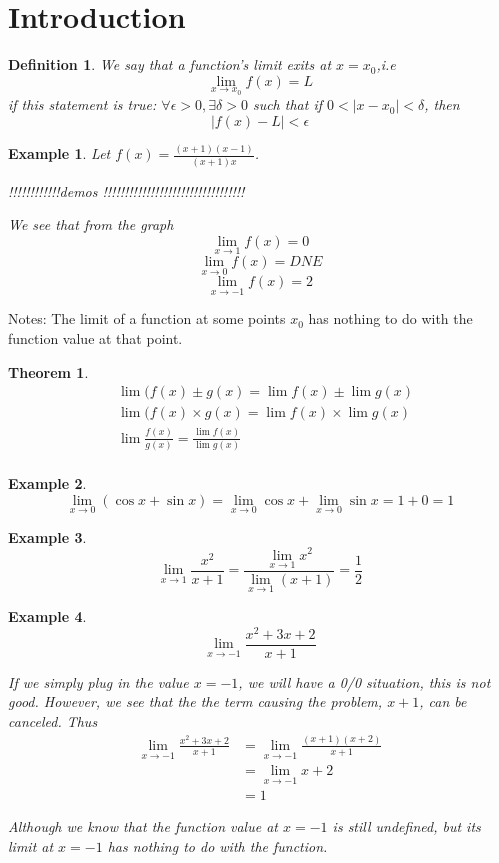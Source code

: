 \documentclass{article}
\newtheorem{definition}{Definition}
\newtheorem{ex}{Example}
\newtheorem{thm}{Theorem}
\begin{document}
\section{Introduction}
\begin{definition}
	 We say that a function's limit exits at $x= x_0$,i.e 
	 \[ \lim_{x\to x_0} f(x) = L \]
	 if this statement is true: $\forall \epsilon>0, \exists \delta>0$ such that if $0<|x-x_0|<\delta$, then
	\[ |f(x)-L| < \epsilon \]
\end{definition}

\begin{ex}
	Let $f(x) = \frac{(x+1)(x-1)}{(x+1)x} $.
	\begin{center}
	 !!!!!!!!!!!!demos !!!!!!!!!!!!!!!!!!!!!!!!!!!!!!!!!
	\end{center}
We see that from the graph 
\[ \lim_{x\to1} f(x) = 0 \]
\[ \lim_{x\to0} f(x) = DNE\]
\[ \lim_{x\to-1} f(x) = 2 \]

\end{ex}

Notes: The limit of a function at some points $x_0$ has nothing to do with the function value at that point.

\begin{thm}
	\begin{align*}
	&\lim (f(x) \pm g(x) = \lim f(x) \pm \lim g(x)\\
	&\lim (f(x) \times g(x) = \lim f(x) \times \lim g(x)\\
	&\lim \frac{f(x)}{g(x)} =\frac{ \lim f(x)}{\lim g(x)}\\
	\end{align*}
\end{thm}

\begin{ex}
	\[\lim_{x\to 0}(\cos x+ \sin x) = \lim_{x\to 0}\cos x + \lim_{x\to 0}\sin x = 1+ 0 =1 \]
\end{ex}

\begin{ex}
	\[ \lim_{x\to 1} \frac{x^2}{x+1} = \frac{\lim_{x\to1} x^2}{\lim_{x\to 1}(x+1)} = \frac{1}{2} \]
\end{ex}
 
\begin{ex}
	\[\lim_{x\to-1}\frac{x^2 + 3x + 2}{x+1}\]
	
	If we simply plug in the value $x=-1$, we will have a 0/0 situation, this is not good. However, we see that the the term causing the problem, $x+1$, can be canceled. Thus
	\begin{align*}
		\lim_{x\to-1} \frac{x^2 +3x +2 }{x+1} 
		&= \lim_{x\to-1} \frac{(x+1)(x+2)}{x+1}\\
		&= \lim_{x\to-1} x+2\\
		&= 1
	\end{align*}
	
	Although we know that the function value at $x=-1$ is still undefined, but its limit at $x=-1$ has nothing to do with the function.   
\end{ex}
\end{document}
